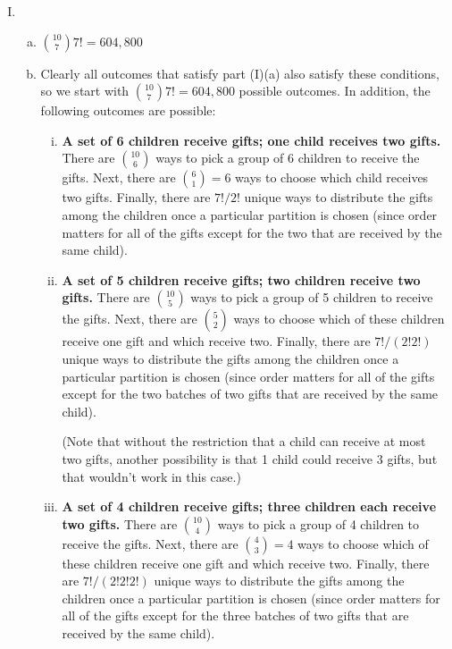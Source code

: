 \begin{enumerate}[(I)]

\item

\begin{enumerate}[(a)]

\item \(\binom{10}{7}7! = \boxed{604,800}\)

\item Clearly all outcomes that satisfy part (I)(a) also satisfy these conditions, so we start with \(\binom{10}{7}7! = 604,800\) possible outcomes. In addition, the following outcomes are possible:

\begin{enumerate}[(i)]

\item \textbf{A set of 6 children receive gifts; one child receives two gifts.} There are \(\binom{10}{6}\) ways to pick a group of 6 children to receive the gifts. Next, there are \(\binom{6}{1} = 6\) ways to choose which child receives two gifts. Finally, there are \(7!/2!\) unique ways to distribute the gifts among the children once a particular partition is chosen (since order matters for all of the gifts except for the two that are received by the same child). 

\item \textbf{A set of 5 children receive gifts; two children receive two gifts.} There are \(\binom{10}{5}\) ways to pick a group of 5 children to receive the gifts. Next, there are \(\binom{5}{2}\) ways to choose which of these children receive one gift and which receive two. Finally, there are \(7!/(2!2!)\) unique ways to distribute the gifts among the children once a particular partition is chosen (since order matters for all of the gifts except for the two batches of two gifts that are received by the same child). 

(Note that without the restriction that a child can receive at most two gifts, another possibility is that 1 child could receive 3 gifts, but that wouldn't work in this case.)

\item \textbf{A set of 4 children receive gifts; three children each receive two gifts.} There are \(\binom{10}{4}\) ways to pick a group of 4 children to receive the gifts. Next, there are \(\binom{4}{3} = 4\) ways to choose which of these children receive one gift and which receive two. Finally, there are \(7!/(2!2!2!)\) unique ways to distribute the gifts among the children once a particular partition is chosen (since order matters for all of the gifts except for the three batches of two gifts that are received by the same child). 


\end{enumerate}
\end{enumerate}
\end{enumerate}
